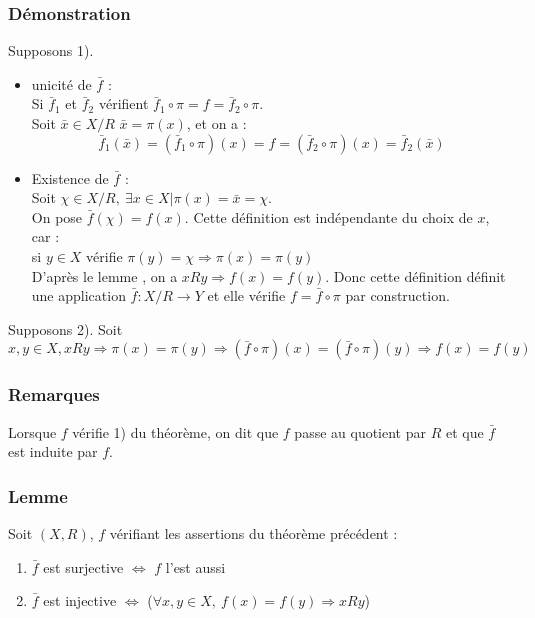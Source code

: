 \documentclass[a4paper, oneside]{report}
\begin{document}
\subsubsection{Démonstration}
Supposons 1).\\
\begin{itemize}
\item unicité de $\bar{f}$ :\\
Si $\bar{f}_1$ et $\bar{f}_2$ vérifient $\bar{f}_1\circ \pi = f = \bar{f}_2 \circ \pi$.\\
Soit $\bar{x}\in X/R$ $\bar{x}=\pi(x)$, et on a :
$$\bar{f}_1(\bar{x})=(\bar{f}_1\circ \pi)(x)=f=(\bar{f}_2\circ \pi)(x)=\bar{f}_2(\bar{x})$$

\item Existence de $\bar{f}$ :\\
Soit $\chi\in X/R,~\exists x\in X | \pi(x)=\bar{x}=\chi$.\\
On pose $\bar{f}(\chi)=f(x)$. Cette définition est indépendante du choix de $x$, car :\\
si $y\in X$ vérifie $\pi(y)=\chi\Rightarrow \pi(x)=\pi(y)$\\
D'après le lemme , on a $xRy \Rightarrow f(x)=f(y)$. Donc cette définition définit une application $\bar{f}:X/R \rightarrow Y$ et elle vérifie $f=\bar{f}\circ \pi$ par construction.\\
\end{itemize}

Supposons 2). Soit $x,y\in X, xRy \Rightarrow \pi(x)=\pi(y)\Rightarrow (\bar{f}\circ \pi)(x)=(\bar{f}\circ \pi)(y)\Rightarrow f(x)=f(y)$

\subsubsection{Remarques}
Lorsque $f$ vérifie 1) du théorème, on dit que $f$ passe au quotient par $R$ et que $\bar{f}$ est induite par $f$.\\

\subsubsection{Lemme}
Soit $(X,R)$, $f$ vérifiant les assertions du théorème précédent :
\begin{enumerate}
\item $\bar{f}$ est surjective $\Leftrightarrow$ $f$ l'est aussi
\item $\bar{f}$ est injective $\Leftrightarrow$ ($\forall x,y\in X,~f(x)=f(y)\Rightarrow xRy$)
\end{enumerate}
\end{document}
